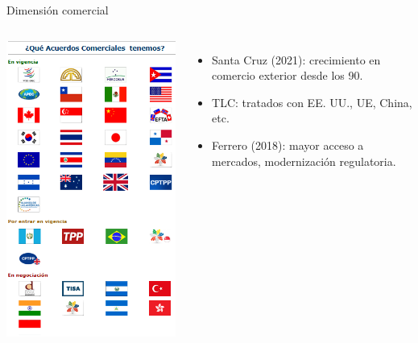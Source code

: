 \documentclass[aspectratio=169]{beamer}
\begin{document}
\begin{frame}{\Large Dimensión comercial}
    \begin{columns}
            \includegraphics[width=\textwidth]{./images/tlc.png} %
            \raggedleft %
            \Large
            \begin{itemize}
                \item Santa Cruz (2021): crecimiento en comercio exterior desde los 90.
                \item TLC: tratados con EE. UU., UE, China, etc.
                \item Ferrero (2018): mayor acceso a mercados, modernización regulatoria.
            \end{itemize}
    \end{columns}
\end{frame}
\end{document}
